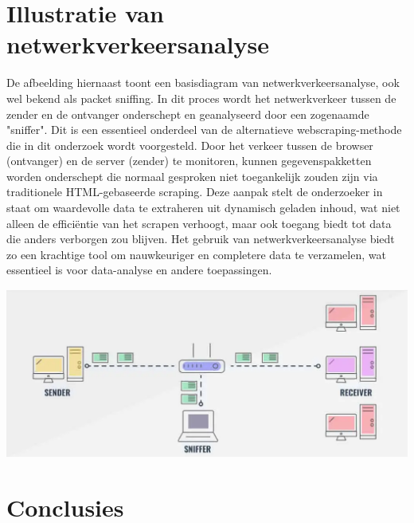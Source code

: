 \documentclass[a0,portrait]{hogent-poster}
\begin{document}
\begin{multicols}{2}
\section{Illustratie van netwerkverkeersanalyse}

De afbeelding hiernaast toont een basisdiagram van netwerkverkeersanalyse, ook wel bekend als packet sniffing. In dit proces wordt het netwerkverkeer tussen de zender en de ontvanger onderschept en geanalyseerd door een zogenaamde "sniffer". Dit is een essentieel onderdeel van de alternatieve webscraping-methode die in dit onderzoek wordt voorgesteld. Door het verkeer tussen de browser (ontvanger) en de server (zender) te monitoren, kunnen gegevenspakketten worden onderschept die normaal gesproken niet toegankelijk zouden zijn via traditionele HTML-gebaseerde scraping. Deze aanpak stelt de onderzoeker in staat om waardevolle data te extraheren uit dynamisch geladen inhoud, wat niet alleen de efficiëntie van het scrapen verhoogt, maar ook toegang biedt tot data die anders verborgen zou blijven. Het gebruik van netwerkverkeersanalyse biedt zo een krachtige tool om nauwkeuriger en completere data te verzamelen, wat essentieel is voor data-analyse en andere toepassingen.

\begin{center}
    \captionsetup{type=figure}
    \includegraphics[width=1.0\linewidth]{graphics/networksniffing.png}
\end{center}


\section{Conclusies}


\end{multicols}
\end{document}

